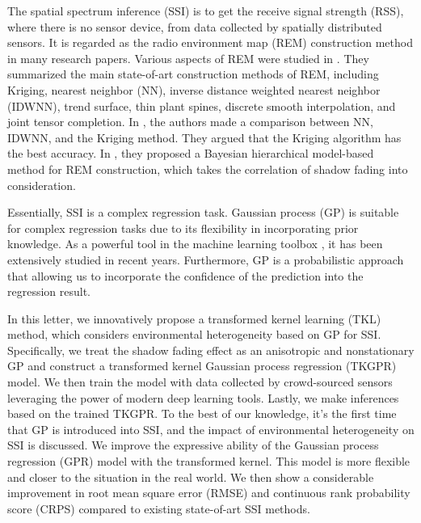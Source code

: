 \documentclass[journal, oneside, twocolumn]{IEEEtran}
\begin{document}
The spatial spectrum inference (SSI) is to get the receive signal strength (RSS), where there is no sensor device, from data collected by spatially distributed sensors. It is regarded as the radio environment map (REM) construction method in many research papers\cite{Phillips2012, Pesko2014, Sato2017, Li2018, Han2019, Katagiri2020, Xu2021}. Various aspects of REM were studied in \cite{Li2018}. They summarized the main state-of-art construction methods of REM, including Kriging, nearest neighbor (NN), inverse distance weighted nearest neighbor (IDWNN), trend surface, thin plant spines, discrete smooth interpolation, and joint tensor completion. In \cite{Han2019}, the authors made a comparison between NN, IDWNN, and the Kriging method. They argued that the Kriging algorithm has the best accuracy. In \cite{Xu2021}, they proposed a Bayesian hierarchical model-based method for REM construction, which takes the correlation of shadow fading into consideration. 

Essentially, SSI is a complex regression task. Gaussian process (GP) is suitable for complex regression tasks due to its flexibility in incorporating prior knowledge. As a powerful tool in the machine learning toolbox \cite{Rasmussen2006}, it has been extensively studied in recent years\cite{Damianou2013, Wilson2013, Duvenaud2014a, Salimbeni2017a, Lee2018, Wilson2019}.  Furthermore, GP is a probabilistic approach that allowing us to incorporate the confidence of the prediction into the regression result.

In this letter, we innovatively propose a transformed kernel learning (TKL) method, which considers environmental heterogeneity based on GP for SSI. Specifically, we treat the shadow fading effect as an anisotropic and nonstationary GP and construct a transformed kernel Gaussian process regression (TKGPR) model. We then train the model with data collected by crowd-sourced sensors leveraging the power of modern deep learning tools. Lastly, we make inferences based on the trained TKGPR. To the best of our knowledge, it's the first time that GP is introduced into SSI, and the impact of environmental heterogeneity on SSI is discussed. We improve the expressive ability of the Gaussian process regression (GPR) model with the transformed kernel. This model is more flexible and closer to the situation in the real world. We then show a considerable improvement in root mean square error (RMSE) and continuous rank probability score (CRPS)\cite{Gneiting2007} compared to existing state-of-art SSI methods.
\end{document}
